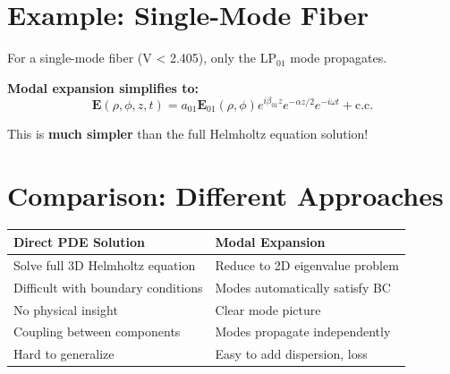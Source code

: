 \documentclass[12pt]{article}
\begin{document}
\begin{center}
\end{center}

\section{Example: Single-Mode Fiber}

For a single-mode fiber (V < 2.405), only the LP$_{01}$ mode propagates.

\textbf{Modal expansion simplifies to:}
\begin{equation}
\mathbf{E}(\rho, \phi, z, t) = a_{01} \mathbf{E}_{01}(\rho, \phi) e^{i\beta_{01} z} e^{-\alpha z/2} e^{-i\omega t} + \text{c.c.}
\end{equation}

This is \textbf{much simpler} than the full Helmholtz equation solution!

\section{Comparison: Different Approaches}

\begin{center}
\begin{tabular}{|p{}|p{}|}
\hline
\textbf{Direct PDE Solution} & \textbf{Modal Expansion} \\
\hline
Solve full 3D Helmholtz equation & Reduce to 2D eigenvalue problem \\
\hline
Difficult with boundary conditions & Modes automatically satisfy BC \\
\hline
No physical insight & Clear mode picture \\
\hline
Coupling between components & Modes propagate independently \\
\hline
Hard to generalize & Easy to add dispersion, loss \\
\hline
\end{tabular}
\end{center}
\end{document}
